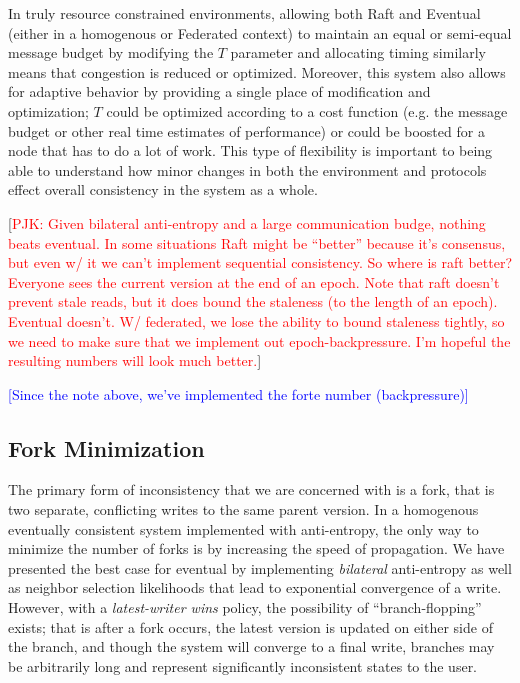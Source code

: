 \documentclass[10pt,conference,letterpaper]{IEEEtran}
\newcommand{\todo}[1]{{\textcolor{red}{#1}}}
\newcommand{\pjk}[1]{[\todo{PJK: #1}]}
\newcommand{\note}[1]{\textcolor{blue}{[#1]}}
\begin{document}
In truly resource constrained environments, allowing both Raft and Eventual (either in a homogenous or Federated context) to maintain an equal or semi-equal message budget by modifying the $T$ parameter and allocating timing similarly means that congestion is reduced or optimized. Moreover, this system also allows for adaptive behavior by providing a single place of modification and optimization; $T$ could be optimized according to a cost function (e.g. the message budget or other real time estimates of performance) or could be boosted for a node that has to do a lot of work. This type of flexibility is important to being able to understand how minor changes in both the environment and protocols effect overall consistency in the system as a whole.

\pjk{Given bilateral anti-entropy and a large communication budge, nothing beats eventual. In some situations Raft might be ``better'' because it's consensus, but even w/ it we can't implement sequential consistency. So where is raft better?  Everyone sees the current version at the end of an epoch. Note that raft doesn't prevent stale reads, but it does bound the staleness (to the length of an epoch). Eventual doesn't.   W/ federated, we lose the ability to bound staleness tightly, so we need to make sure that we implement out epoch-backpressure. I'm hopeful the resulting numbers will look much better.}

\note{Since the note above, we've implemented the forte number (backpressure)}

\subsection{Fork Minimization}

The primary form of inconsistency that we are concerned with is a fork, that is two separate, conflicting writes to the same parent version. In a homogenous eventually consistent system implemented with anti-entropy, the only way to minimize the number of forks is by increasing the speed of propagation. We have presented the best case for eventual by implementing \textit{bilateral} anti-entropy as well as neighbor selection likelihoods that lead to exponential convergence of a write. However, with a \textit{latest-writer wins} policy, the possibility of ``branch-flopping'' exists; that is after a fork occurs, the latest version is updated on either side of the branch, and though the system will converge to a final write, branches may be arbitrarily long and represent significantly inconsistent states to the user.
\end{document}

